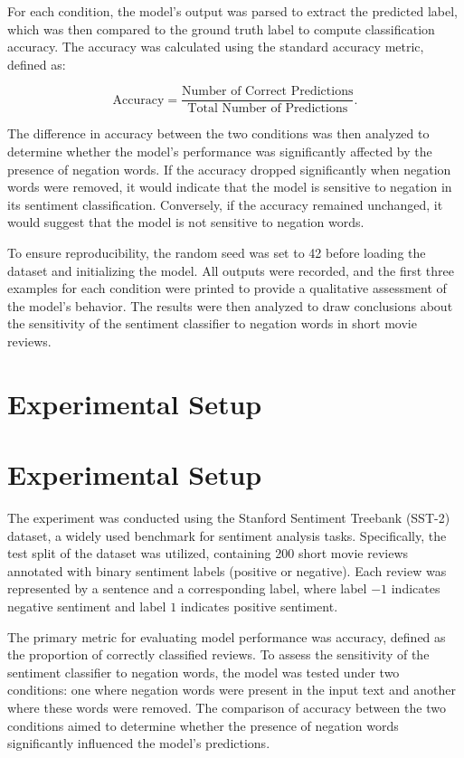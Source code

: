 \documentclass{article}
\begin{document}
For each condition, the model's output was parsed to extract the predicted label, which was then compared to the ground truth label to compute classification accuracy. The accuracy was calculated using the standard accuracy metric, defined as:

$$
\text{Accuracy} = \frac{\text{Number of Correct Predictions}}{\text{Total Number of Predictions}}.
$$

The difference in accuracy between the two conditions was then analyzed to determine whether the model's performance was significantly affected by the presence of negation words. If the accuracy dropped significantly when negation words were removed, it would indicate that the model is sensitive to negation in its sentiment classification. Conversely, if the accuracy remained unchanged, it would suggest that the model is not sensitive to negation words.

To ensure reproducibility, the random seed was set to 42 before loading the dataset and initializing the model. All outputs were recorded, and the first three examples for each condition were printed to provide a qualitative assessment of the model's behavior. The results were then analyzed to draw conclusions about the sensitivity of the sentiment classifier to negation words in short movie reviews.
\section{Experimental Setup}
\section{Experimental Setup}

The experiment was conducted using the Stanford Sentiment Treebank (SST-2) dataset, a widely used benchmark for sentiment analysis tasks. Specifically, the test split of the dataset was utilized, containing 200 short movie reviews annotated with binary sentiment labels (positive or negative). Each review was represented by a sentence and a corresponding label, where label $-1$ indicates negative sentiment and label $1$ indicates positive sentiment. 

The primary metric for evaluating model performance was accuracy, defined as the proportion of correctly classified reviews. To assess the sensitivity of the sentiment classifier to negation words, the model was tested under two conditions: one where negation words were present in the input text and another where these words were removed. The comparison of accuracy between the two conditions aimed to determine whether the presence of negation words significantly influenced the model's predictions.
\end{document}
